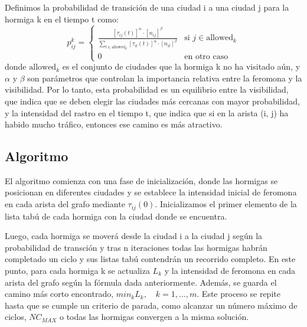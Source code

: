 Definimos la probabilidad de transición de una ciudad i a una ciudad j para la hormiga k en el tiempo t como:
\begin{equation}
    p_{ij}^k = \begin{cases}
    \frac{[\tau_{ij}(t)]^{\alpha} \cdot [n_{ij}]^{\beta}}{\sum_{l \in \text{allowed}_k} [\tau_{il}(t)]^{\alpha} \cdot [n_{il}]^{\beta}} & \text{si } j \in \text{allowed}_k\\
    0 & \text{en otro caso}
    \end{cases}
    \label{eq}
\end{equation}
donde $\text{allowed}_k$ es el conjunto de ciudades que la hormiga k no ha visitado aún, y $\alpha$ y $\beta$ son parámetros que controlan la
importancia relativa entre la feromona y la visibilidad.
Por lo tanto, esta probabilidad es un equilibrio entre la visibilidad, que indica que se deben elegir las ciudades más cercanas con mayor probabilidad,
y la intensidad del rastro en el tiempo t, que indica que si en la arista (i, j) ha habido mucho tráfico, entonces ese camino es más atractivo.

\subsection{Algoritmo}

El algoritmo comienza con una fase de inicialización, donde las hormigas se posicionan en diferentes ciudades y se establece la intensidad inicial de feromona en cada arista del grafo
mediante $\tau_{ij}(0)$. Inicializamos el primer elemento de la lista tabú de cada hormiga con la ciudad donde se encuentra.

Luego, cada hormiga se moverá desde la ciudad i a la ciudad j según la probabilidad de transción y tras n iteraciones todas las hormigas habrán completado un ciclo y sus listas tabú contendrán un recorrido completo.
En este punto, para cada hormiga k se actualiza $L_k$ y la intensidad de feromona en cada arista del grafo según la fórmula dada anteriormente.
Además, se guarda el camino más corto encontrado, $min_k L_k, \quad k = 1,...,m$.
Este proceso se repite hasta que se cumple un criterio de parada, como alcanzar un número máximo de ciclos, $NC_{MAX}$ o todas las hormigas convergen a la misma solución.

